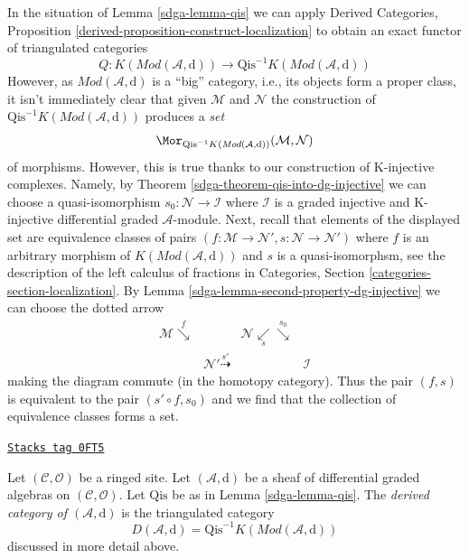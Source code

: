 In the situation of Lemma \ref{sdga-lemma-qis} we can apply
Derived Categories, Proposition
\ref{derived-proposition-construct-localization}
to obtain an exact functor of triangulated categories
$$
Q :
K(\textit{Mod}(\mathcal{A}, \text{d}))
\longrightarrow
\text{Qis}^{-1}K(\textit{Mod}(\mathcal{A}, \text{d}))
$$
However, as $\textit{Mod}(\mathcal{A}, \text{d})$ is a ``big''
category, i.e., its objects form a proper class, it isn't immediately
clear that given $\mathcal{M}$ and $\mathcal{N}$ the construction
of $\text{Qis}^{-1}K(\textit{Mod}(\mathcal{A}, \text{d}))$
produces a {\it set}
$$
\Mor_{\text{Qis}^{-1}K(\textit{Mod}(\mathcal{A}, \text{d}))}
(\mathcal{M}, \mathcal{N})
$$
of morphisms. However, this is true thanks to our construction of
K-injective complexes. Namely, by Theorem \ref{sdga-theorem-qis-into-dg-injective}
we can choose a quasi-isomorphism $s_0 : \mathcal{N} \to \mathcal{I}$ where
$\mathcal{I}$ is a graded injective and K-injective
differential graded $\mathcal{A}$-module. Next, recall that elements of
the displayed set are equivalence classes of pairs
$(f : \mathcal{M} \to \mathcal{N}', s : \mathcal{N} \to \mathcal{N}')$
where $f$ is an arbitrary morphism of
$K(\textit{Mod}(\mathcal{A}, \text{d}))$ and $s$ is a quasi-isomorphsm, see
the description of the left calculus of fractions in
Categories, Section \ref{categories-section-localization}.
By Lemma \ref{sdga-lemma-second-property-dg-injective}
we can choose the dotted arrow
$$
\begin{array}{cccc}\mathcal{M} \overset{f}{\searrow} &  & \mathcal{N} \underset{s}{\swarrow}\overset{s_0}{\searrow} &  \\  & \mathcal{N}' \overset{s'}{\dashrightarrow} &  & \mathcal{I}\end{array}
$$
making the diagram commute (in the homotopy category).
Thus the pair $(f, s)$ is equivalent to the pair $(s' \circ f, s_0)$
and we find that the collection of equivalence classes forms a set.

\begin{definition}
\label{sdga-definition-derived-category}
\href{https://stacks.math.columbia.edu/tag/0FT5}{\texttt{Stacks tag 0FT5}}

Let $(\mathcal{C}, \mathcal{O})$ be a ringed site. Let
$(\mathcal{A}, \text{d})$ be a sheaf of differential graded algebras
on $(\mathcal{C}, \mathcal{O})$. Let $\text{Qis}$ be as in
Lemma \ref{sdga-lemma-qis}. The
{\it derived category of $(\mathcal{A}, \text{d})$} is the triangulated
category
$$
D(\mathcal{A}, \text{d}) =
\text{Qis}^{-1}K(\textit{Mod}(\mathcal{A}, \text{d}))
$$
discussed in more detail above.
\end{definition}

